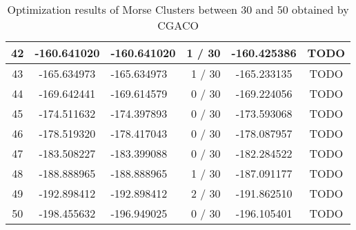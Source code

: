 \begin{table}[!htbp]
\begin{center}
\begin{tabular}{| c | c | p{3cm} | r | c | c |}
				42 & -160.641020 & -160.641020 & 1 / 30 & -160.425386 & TODO \\ \hline
				43 & -165.634973 & -165.634973 & 1 / 30 & -165.233135 & TODO \\ \hline
				44 & -169.642441 & -169.614579 & 0 / 30 & -169.224056 & TODO \\ \hline
				45 & -174.511632 & -174.397893 & 0 / 30 & -173.593068 & TODO \\ \hline
				46 & -178.519320 & -178.417043 & 0 / 30 & -178.087957 & TODO \\ \hline
				47 & -183.508227 & -183.399088 & 0 / 30 & -182.284522 & TODO \\ \hline
				48 & -188.888965 & -188.888965 & 1 / 30 & -187.091177 & TODO \\ \hline
				49 & -192.898412 & -192.898412 & 2 / 30 & -191.862510 & TODO \\ \hline
				50 & -198.455632 & -196.949025 & 0 / 30 & -196.105401 & TODO \\ \hline
			\end{tabular}
		\caption{Optimization results of Morse Clusters between 30 and 50 obtained by CGACO}
		\label{tab:optimization_results}
		\end{center}
	\end{table}
	
	
	
	
	
	
	
	
	
	

	